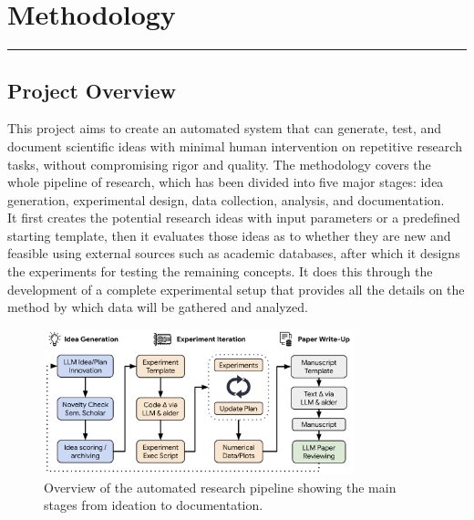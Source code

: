 \chapter{Methodology}
\vspace{-1.5cm}
\hspace{-1cm}\rule{19cm}{0.4pt} 

\section{Project Overview}
This project aims to create an automated system that can generate, test, and document scientific ideas with minimal human intervention on repetitive research tasks, without compromising rigor and quality. The methodology covers the whole pipeline of research, which has been divided into five major stages: idea generation, experimental design, data collection, analysis, and documentation.\\
It first creates the potential research ideas with input parameters or a predefined starting template, then it evaluates those ideas as to whether they are new and feasible using external sources such as academic databases, after which it designs the experiments for testing the remaining concepts. It does this through the development of a complete experimental setup that provides all the details on the method by which data will be gathered and analyzed.
\begin{figure}
    \centering
    \includegraphics[width=0.8\textwidth]{images/flowchart.png}
    \caption{Overview of the automated research pipeline showing the main stages from ideation to documentation.}
    \label{fig:methodology} %
\end{figure}

